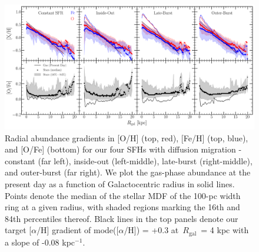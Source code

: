 \documentclass[draft2.tex]{subfiles}
\begin{document}
\begin{figure} 
\centering 
\includegraphics[scale = 0.32]{metallicity_gradient.pdf} 
\caption{Radial abundance gradients in [O/H] (top, red), [Fe/H] (top, blue), 
and [O/Fe] (bottom) for our four SFHs with diffusion migration - constant (far 
left), inside-out (left-middle), late-burst (right-middle), and outer-burst 
(far right). We plot the gas-phase abundance at the present day as a function 
of Galactocentric radius in solid lines. Points denote the median of the stellar 
MDF of the 100-pc width ring at a given radius, with shaded regions marking 
the 16th and 84th percentiles thereof. Black lines in the top panels denote our 
target [$\alpha$/H] gradient of mode([$\alpha$/H]) = +0.3 at~$R_\text{gal}$~= 
4 kpc with a slope of -0.08 kpc$^{-1}$. } 
\label{fig:metallicity_gradient} 
\end{figure} 
\end{document}
